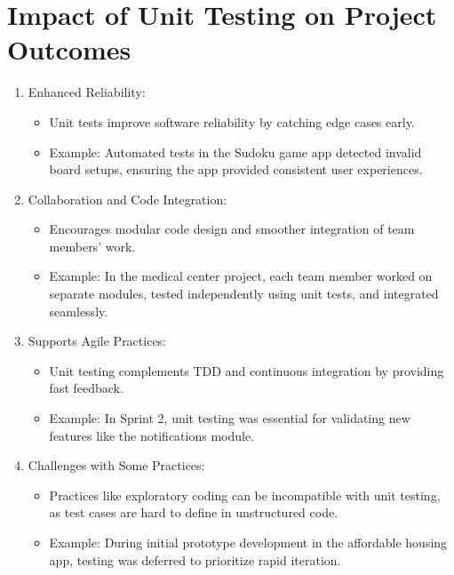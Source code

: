\documentclass[a4paper,12pt]{article}
\begin{document}
\section{Impact of Unit Testing on Project Outcomes}
\begin{enumerate}
    \item Enhanced Reliability:
        \begin{itemize}
 \item Unit tests improve software reliability by catching edge cases early.
 \item Example: Automated tests in the Sudoku game app detected invalid board setups, ensuring the app provided consistent user experiences.
 \end{itemize}
 \item Collaboration and Code Integration:
     \begin{itemize}
 \item Encourages modular code design and smoother integration of team members’ work.
 \item Example: In the medical center project, each team member worked on separate modules, tested independently using unit tests, and integrated seamlessly.
 \end{itemize}
 \item Supports Agile Practices:
     \begin{itemize}
 \item Unit testing complements TDD and continuous integration by providing fast feedback.
 \item Example: In Sprint 2, unit testing was essential for validating new features like the notifications module.
 \end{itemize}
 \item Challenges with Some Practices:
     \begin{itemize}
 \item Practices like exploratory coding can be incompatible with unit testing, as test cases are hard to define in unstructured code.
 \item Example: During initial prototype development in the affordable housing app, testing was deferred to prioritize rapid iteration.
 \end{itemize}
\end{enumerate}
\end{document}
